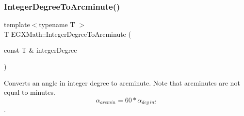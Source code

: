 \mbox{\label{group___e_g_x_math-_angle_conversions-_integer_degree_ga78b014e7649d666a3647c467e64e4fe8}} 
\subsubsection{\texorpdfstring{Integer\+Degree\+To\+Arcminute()}{IntegerDegreeToArcminute()}}
{\footnotesize\ttfamily template$<$typename T $>$ \\
T E\+G\+X\+Math\+::\+Integer\+Degree\+To\+Arcminute (\begin{DoxyParamCaption}\item[{const T \&}]{integer\+Degree }\end{DoxyParamCaption})}



Converts an angle in integer degree to arcminute. Note that arcminutes are not equal to minutes. \[\alpha_{arcmin}= 60 * \alpha_{deg\ int}\]. 

